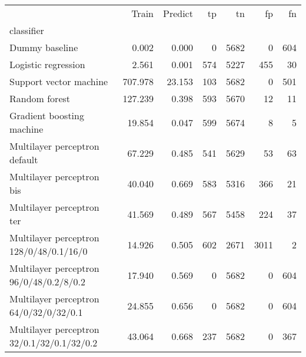 \begin{tabular}{lrrrrrr}
\toprule
 & Train & Predict & tp & tn & fp & fn \\
classifier &  &  &  &  &  &  \\
\midrule
Dummy baseline & 0.002 & 0.000 & 0 & 5682 & 0 & 604 \\
Logistic regression & 2.561 & 0.001 & 574 & 5227 & 455 & 30 \\
Support vector machine & 707.978 & 23.153 & 103 & 5682 & 0 & 501 \\
Random forest & 127.239 & 0.398 & 593 & 5670 & 12 & 11 \\
Gradient boosting machine & 19.854 & 0.047 & 599 & 5674 & 8 & 5 \\
Multilayer perceptron default & 67.229 & 0.485 & 541 & 5629 & 53 & 63 \\
Multilayer perceptron bis & 40.040 & 0.669 & 583 & 5316 & 366 & 21 \\
Multilayer perceptron ter & 41.569 & 0.489 & 567 & 5458 & 224 & 37 \\
Multilayer perceptron 128/0/48/0.1/16/0 & 14.926 & 0.505 & 602 & 2671 & 3011 & 2 \\
Multilayer perceptron 96/0/48/0.2/8/0.2 & 17.940 & 0.569 & 0 & 5682 & 0 & 604 \\
Multilayer perceptron 64/0/32/0/32/0.1 & 24.855 & 0.656 & 0 & 5682 & 0 & 604 \\
Multilayer perceptron 32/0.1/32/0.1/32/0.2 & 43.064 & 0.668 & 237 & 5682 & 0 & 367 \\
\bottomrule
\end{tabular}
